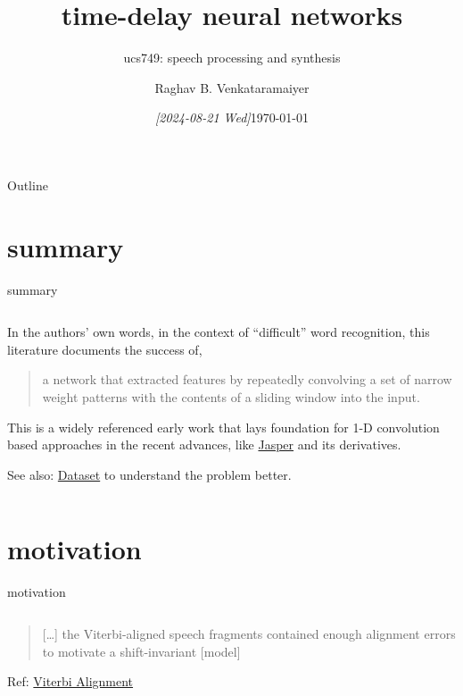 \documentclass[aspectratio=169,xcolor={dvipsnames,svgnames}]{beamer}
\date{\textit{[2024-08-21 Wed]}}
\title{time-delay neural networks}
\subtitle{ucs749: speech processing and synthesis}
\author{%
\normalsize Raghav B. Venkataramaiyer
}
\institute{%
CSED TIET Patiala India.
}
\date{\scriptsize \today}
\begin{document}
\maketitle
\begin{frame}{Outline}
\tableofcontents
\end{frame}


\section{summary}
\label{sec:org8d5a40f}
\begin{frame}[label={sec:summary}]{summary}
\begin{columns}
\begin{column}{.7\columnwidth}
In the authors' own words, in the context of
``difficult'' word recognition, this literature documents
the success of,

\begin{quote}
a network that extracted features by repeatedly
convolving a set of narrow weight patterns with the
contents of a sliding window into the input.
\end{quote}

This is a widely referenced early work that lays
foundation for 1-D convolution based approaches in the
recent advances, like \href{../jasper/}{Jasper} and its derivatives.

\alert{See also}: \hyperlink{sec:dataset}{Dataset} to understand the problem better.
\end{column}
\end{columns}
\end{frame}

\section{motivation}
\label{sec:orga829b3a}

\begin{frame}[label={sec:motivation}]{motivation}
\begin{columns}
\begin{column}{.45\columnwidth}
\begin{quote}
[\ldots] the Viterbi-aligned speech fragments contained
enough alignment errors to motivate a shift-invariant
[model]
\end{quote}

Ref: \hyperlink{sec:viterbi-alignment}{Viterbi Alignment}
\end{column}
\end{columns}
\end{frame}
\end{document}
